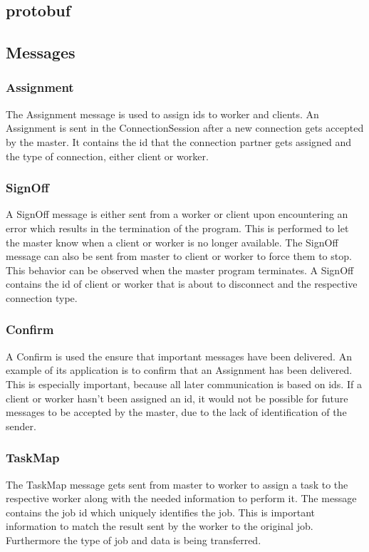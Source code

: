 \documentclass[12pt, letterpaper]{article}
\begin{document}
\subsection{protobuf}

\subsection{Messages}

\subsubsection{Assignment}
The Assignment message is used to assign ids to worker and clients. An Assignment is sent in the ConnectionSession after a new connection gets accepted by the master. It contains the id that the connection partner gets assigned and the type of connection, either client or worker.

\subsubsection{SignOff}
A SignOff message is either sent from a worker or client upon encountering an error which results in the termination of the program. This is performed to let the master know when a client or worker is no longer available. The SignOff message can also be sent from master to client or worker to force them to stop. This behavior can be observed when the master program terminates. A SignOff contains the id of client or worker that is about to disconnect and the respective connection type.

\subsubsection{Confirm}
A Confirm is used the ensure that important messages have been delivered. An example of its application is to confirm that an Assignment has been delivered. This is especially important, because all later communication is based on ids. If a client or worker hasn't been assigned an id, it would not be possible for future messages to be accepted by the master, due to the lack of identification of the sender. 

\subsubsection{TaskMap}
The TaskMap message gets sent from master to worker to assign a task to the respective worker along with the needed information to perform it. The message contains the job id which uniquely identifies the job. This is important information to match the result sent by the worker to the original job. Furthermore the type of job and data is being transferred.
\end{document}
